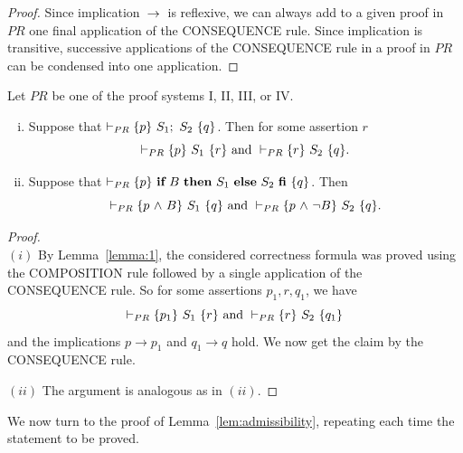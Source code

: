 \documentclass[runningheads]{llncs}       %
\begin{document}
\begin{proof}
Since implication $\mbox{$\:\rightarrow\:$}$ is reflexive, we can always add to a given proof in $\mathit{PR}$
one final application of the CONSEQUENCE rule.
Since implication is transitive, successive applications of the CONSEQUENCE rule in a proof in $\mathit{PR}$
can be condensed into one application.
\HB
\end{proof} 

\begin{lemma} \label{lem:useful}
Let $\mathit{PR}$ be one of the proof systems I, II, III, or IV.
  \begin{enumerate} [(i)] 
  \item  Suppose that  $\vdash_{PR} \HT{p}{S_1; \ S_2}{q}$.
    Then for some assertion $r$
    \[
 \vdash_{PR} \mbox{$\{{p}\}\ {S_1}\ \{{r}\}$} \mbox{ and }
 \vdash_{PR} \mbox{$\{{r}\}\ {S_2}\ \{{q}\}$}.
\]

\item Suppose that  $\vdash_{PR} \mbox{$\{{p}\}\ {\mbox{$\mbox{{\bf if}\ } {B} \mbox{\ {\bf then}\ } {S_1} \mbox{\ {\bf else}\ } {S_2}\ \mbox{{\bf fi}}$}}\ \{{q}\}$}$.
    Then 
    \[
 \vdash_{PR} \mbox{$\{{p \mbox{$\ \wedge\ $} B}\}\ {S_1}\ \{{q}\}$} \mbox{ and }
 \vdash_{PR} \mbox{$\{{p \mbox{$\ \wedge\ $} \neg B}\}\ {S_2}\ \{{q}\}$}.
\]
 \end{enumerate}    
\end{lemma}
\begin{proof}
  \mbox{} \\
  $(i)$ By Lemma~\ref{lemma:1}, the considered correctness formula was proved using
  the COMPOSITION rule followed by a single application of the CONSEQUENCE rule.
  So for some assertions $p_1, r, q_1$, we have
    \[
 \vdash_{PR} \mbox{$\{{p_1}\}\ {S_1}\ \{{r}\}$} \mbox{ and }
 \vdash_{PR} \mbox{$\{{r}\}\ {S_2}\ \{{q_1}\}$}
\]
and the implications $p \to p_1$ and $q_1 \to q$ hold.
We now get the claim by the CONSEQUENCE rule.
\III

\NI
$(ii)$ The argument is analogous as in $(ii)$. 
\HB
\end{proof}



We now turn to the proof of Lemma~\ref{lem:admissibility}, 
repeating each time the statement to be proved.
\end{document}
